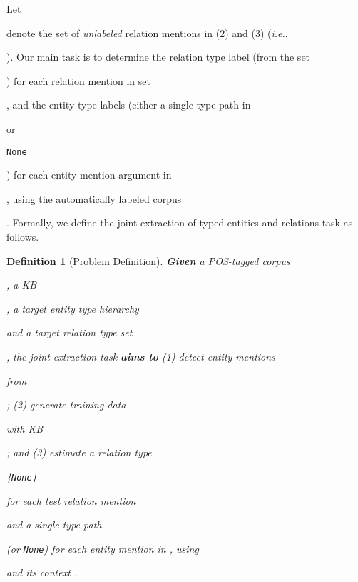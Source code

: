 \documentclass[letterpaper]{sig-alternate-2013}
\newtheorem{definition}{Definition}
\def\ie{{\sl i.e.}}
\begin{document}
Let \begin{small}\end{small} denote the set of \textit{unlabeled} relation mentions in (2) and (3) (\ie, \begin{small}\end{small}).
Our main task is to determine the relation type label (from the set \begin{small}\end{small}) for each relation mention in set \begin{small}\end{small}, and the entity type labels (either a single type-path in \begin{small}\end{small} or \begin{small}\texttt{None}\end{small}) for each entity mention argument in \begin{small}\end{small}, using the automatically labeled corpus \begin{small}\end{small}. Formally, we define the joint extraction of typed entities and relations task as follows.
\begin{definition}[Problem Definition]
\textbf{Given} a POS-tagged corpus \begin{small}\end{small}, a KB \begin{small}\end{small}, a target entity type hierarchy \begin{small}\end{small} and a target relation type set \begin{small}\end{small}, the joint extraction task \textbf{aims to} (1) detect entity mentions \begin{small}\end{small} from \begin{small}\end{small}; (2) generate training data \begin{small}\end{small} with KB \begin{small}\end{small}; and (3) estimate a relation type \begin{small}\{\texttt{None}\}\end{small} for each test relation mention \begin{small}\end{small} and a single type-path \begin{small}\end{small} (or \texttt{None}) for each entity mention in , using \begin{small}\end{small} and its context .
\end{definition}
\end{document}
